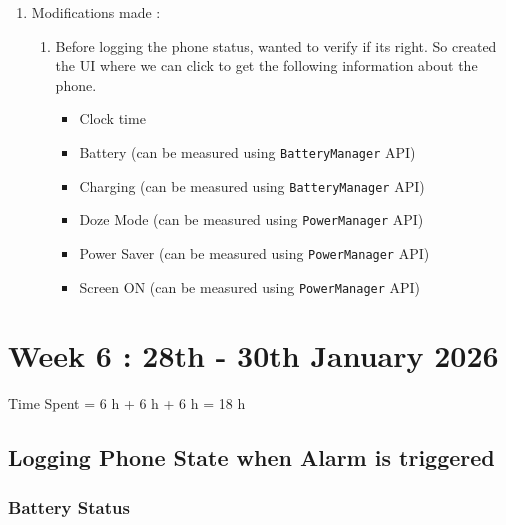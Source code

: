\documentclass{article}
\begin{document}
\begin{enumerate}
\begin{itemize}
        \item Once the alarm is scheduled, the request is sent to AlarmManager, which stores all the alarm requests and monitors time.
        
        If its time, the alarm is triggered - that is, it informs the respective applciation and that application inturn calls the worker which executes the task as per the alarm request code.
    \end{itemize}

    \item Modifications made : 
    \begin{enumerate}
        \item Before logging the phone status, wanted to verify if its right. 
        So created the UI where we can click to get the following information about the phone.
        \begin{itemize}
            \item Clock time
            \item Battery (can be measured using \texttt{BatteryManager} API)
            \item Charging (can be measured using \texttt{BatteryManager} API)
            \item Doze Mode (can be measured using \texttt{PowerManager} API)
            \item Power Saver (can be measured using \texttt{PowerManager} API)
            \item Screen ON (can be measured using \texttt{PowerManager} API)
        \end{itemize}
    \end{enumerate}

\end{enumerate}

\newpage
\section{Week 6 : 28th - 30th January 2026}
Time Spent = 6 h + 6 h + 6 h = 18 h

\subsection{Logging Phone State when Alarm is triggered}
\subsubsection{Battery Status}
\end{document}
